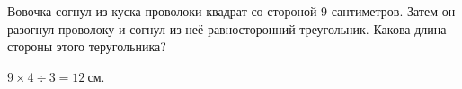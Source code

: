 \documentclass[10pt]{scrbook} \usepackage{modules/nonstahp_book}
\begin{document}


\begin{itemize}

	\itA Вовочка согнул из куска проволоки квадрат со стороной 9 сантиметров. Затем он разогнул проволоку и согнул из неё равносторонний треугольник. Какова длина стороны этого теругольника?

	\itr $9 \times 4 \div 3 = \SI{12}{\text{см}}$.

\end{itemize}
\end{document}
